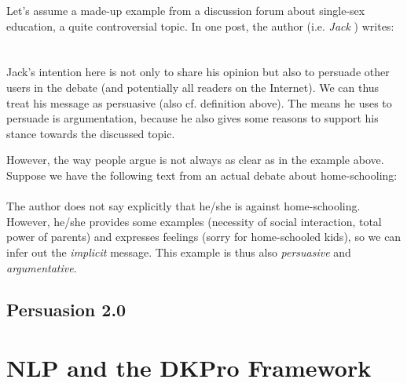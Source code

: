 Let’s assume a made-up example from a discussion forum about single-sex education, a quite
controversial topic. In one post, the author (i.e. \emph{Jack} ) writes:
\\
\\
\\

Jack’s intention here is not only to share his opinion but also to persuade other users in the
debate (and potentially all readers on the Internet). We can thus treat his message as persuasive
(also cf. definition above). The means he uses to persuade is argumentation, because he also gives
some reasons to support his stance towards the discussed topic.

However, the way people argue is not always as clear as in the example above. Suppose we have the following text from an actual debate about home-schooling:
\\
\\

The author does not say explicitly that he/she is against home-schooling. However, he/she
provides some examples (necessity of social interaction, total power of parents) and expresses
feelings (sorry for home-schooled kids), so we can infer out the \emph{implicit} message. This example is
thus also \emph{persuasive} and \emph{argumentative}.
\subsection{Persuasion 2.0} %

\section{NLP and the DKPro Framework}
